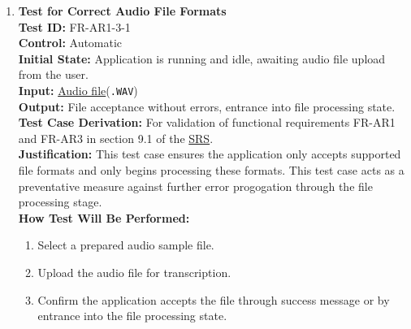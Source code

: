 \documentclass[12pt, titlepage]{article}
\begin{document}
  \begin{enumerate}
    \item \textbf{Test for Correct Audio File Formats} \\
      \newline
      \textbf{Test ID:} FR-AR1-3-1 \\
      \textbf{Control:} Automatic \\
      \textbf{Initial State:} Application is running and idle, awaiting audio file upload from the user. \\
      \textbf{Input:} \href{https://github.com/emilyperica/ScoreGen/blob/main/test/TestingDatasets/piano-samples/sample-scales/c-major-scale-on-treble-clef.wav}{Audio file}(\texttt{.WAV}) \\
      \textbf{Output:} File acceptance without errors, entrance into file processing state. \\
      \textbf{Test Case Derivation:} For validation of functional requirements FR-AR1 and FR-AR3 in section 9.1 of the 
      \href{https://github.com/emilyperica/ScoreGen/blob/main/docs/SRS-Volere/SRS.pdf}{SRS}. \\
      \textbf{Justification:} This test case ensures the application only accepts supported file formats and only begins processing 
      these formats. This test case acts as a preventative measure against further error progogation through the file processing stage.\\
      \textbf{How Test Will Be Performed:}
      \begin{enumerate}
          \item Select a prepared audio sample file.
          \item Upload the audio file for transcription.
          \item Confirm the application accepts the file through success message or by entrance into the file processing state.
      \end{enumerate}
  

\end{enumerate}
\end{document}
